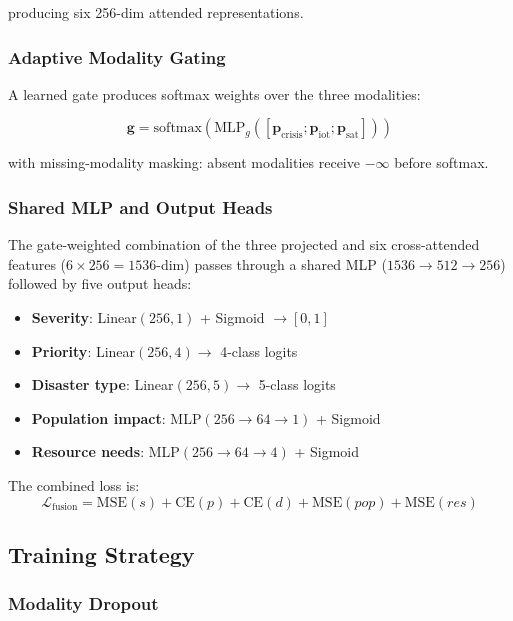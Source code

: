\documentclass[journal]{IEEEtran}
\begin{document}
producing six 256-dim attended representations.

\subsubsection{Adaptive Modality Gating}

A learned gate produces softmax weights over the three modalities:

\begin{equation}
\mathbf{g} = \text{softmax}(\text{MLP}_g([\mathbf{p}_\text{crisis}; \mathbf{p}_\text{iot}; \mathbf{p}_\text{sat}]))
\end{equation}

with missing-modality masking: absent modalities receive $-\infty$ before softmax.

\subsubsection{Shared MLP and Output Heads}

The gate-weighted combination of the three projected and six cross-attended features ($6 \times 256 = 1536$-dim) passes through a shared MLP ($1536 \to 512 \to 256$) followed by five output heads:

\begin{itemize}
    \item \textbf{Severity}: Linear$(256,1)$ + Sigmoid $\to [0,1]$
    \item \textbf{Priority}: Linear$(256,4) \to$ 4-class logits
    \item \textbf{Disaster type}: Linear$(256,5) \to$ 5-class logits
    \item \textbf{Population impact}: MLP$(256 \to 64 \to 1)$ + Sigmoid
    \item \textbf{Resource needs}: MLP$(256 \to 64 \to 4)$ + Sigmoid
\end{itemize}

The combined loss is:
\begin{equation}
\mathcal{L}_\text{fusion} = \text{MSE}(s) + \text{CE}(p) + \text{CE}(d) + \text{MSE}(pop) + \text{MSE}(res)
\end{equation}

\subsection{Training Strategy}

\subsubsection{Modality Dropout}
\end{document}
